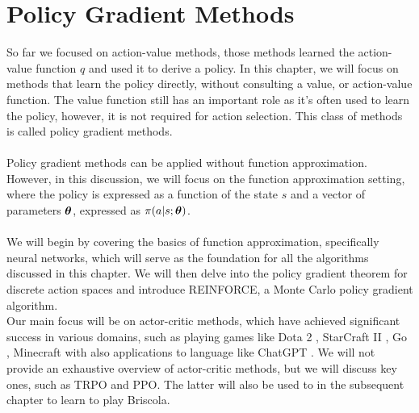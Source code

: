 \chapter{Policy Gradient Methods}
So far we focused on action-value methods, those methods learned the action-value function $q$ and used it to derive a policy. In this chapter, we will focus on methods that learn the policy directly, without consulting a value, or action-value function. The value function still has an important role as it's often used to learn the policy, however, it is not required for action selection. This class of methods is called policy gradient methods.\\\\
Policy gradient methods can be applied without function approximation. However, in this discussion, we will focus on the function approximation setting, where the policy is expressed as a function of the state $s$ and a vector of parameters $\boldsymbol{\theta}$, expressed as $\pi(a|s; \boldsymbol{\theta})$.\\\\
We will begin by covering the basics of function approximation, specifically neural networks, which will serve as the foundation for all the algorithms discussed in this chapter. We will then delve into the policy gradient theorem for discrete action spaces and introduce REINFORCE, a Monte Carlo policy gradient algorithm.\\
Our main focus will be on actor-critic methods, which have achieved significant success in various domains, such as playing games like Dota 2 \cite{open-ai-five}, StarCraft II \cite{alphastar}, Go \cite{alphago-fan}, Minecraft \cite{minecraft-vpt, dreamer-v3} with also applications to language like ChatGPT \cite{instruct-gpt}. We will not provide an exhaustive overview of actor-critic methods, but we will discuss key ones, such as TRPO and PPO. The latter will also be used to in the subsequent chapter to learn to play Briscola.

